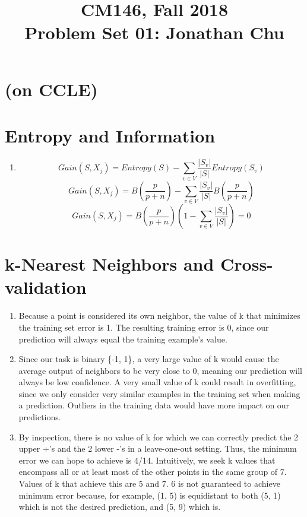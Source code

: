 \documentclass[11pt]{article}
\newcommand{\cnum}{CM146}
\newcommand{\ced}{Fall 2018}
\newcommand{\ctitle}[3]{\title{\vspace{-0.5in}\cnum, \ced\\Problem Set #1: #2}}
\newcommand{\solution}[1]{{{\color{black}{\bf Solution:} {#1}}}}
\begin{document}
\ctitle{01}{Jonathan Chu}
\date{}
\maketitle
\vspace{-0.75in}

\section{(on CCLE)}
\section{Entropy and Information}
\begin{enumerate}
\item

\solution{
$$Gain(S, X_j) = Entropy(S) - \sum_{v \in V} \frac{|S_v|}{|S|}Entropy(S_v)$$
$$Gain(S, X_j) = B\left(\frac{p}{p+n}\right) - \sum_{v \in V} \frac{|S_v|}{|S|}B\left(\frac{p}{p+n}\right)$$
$$Gain(S, X_j) = B\left(\frac{p}{p+n}\right)\left(1 - \sum_{v \in V}\frac{|S_v|}{|S|}\right) = 0$$
}

\end{enumerate}

\section{k-Nearest Neighbors and Cross-validation}
\begin{enumerate}
\item %
\solution{Because a point is considered its own neighbor, the value of k that minimizes the training set error is 1. The resulting training error is 0, since our prediction will always equal the training example's value.}
\vspace{0.5cm}

\item %
\solution{
Since our task is binary \{-1, 1\}, a very large value of k would cause the average output of neighbors to be very close to 0, meaning our prediction will always be low confidence.
\newline
\newline
A very small value of k could result in overfitting, since we only consider very similar examples in the training set when making a prediction. Outliers in the training data would have more impact on our predictions.
}
\vspace{0.5cm}

\item %
\solution{
By inspection, there is no value of k for which we can correctly predict the 2 upper +'s and the 2 lower -'s in a leave-one-out setting. Thus, the minimum error we can hope to achieve is 4/14. Intuitively, we seek k values that encompass all or at least most of the other points in the same group of 7. 
\newline
\newline
Values of k that achieve this are 5 and 7. 6 is not guaranteed to achieve minimum error because, for example, (1, 5) is equidistant to both (5, 1) which is not the desired prediction, and (5, 9) which is.
}
\end{enumerate}
\end{document}
